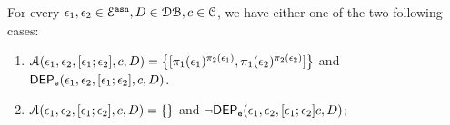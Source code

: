 %
\begin{lem}
\label{lem:inv_alg2}
For every $\mathtt{\epsilon}_1, \mathtt{\epsilon}_2 \in \mathcal{E}^{\mathtt{{asn}}}, D \in \mathcal{DB} , c \in \mathcal{C}$, we have either one of the two following cases:
\begin{enumerate}
  \item $\mathcal{A}(\event_1, \event_2,  [\event_1; \event_2], c, D) = 
  \left\{[\pi_1(\event_1)^{\pi_2(\event_1)}, \pi_1(\event_2)^{\pi_2(\event_2)}] \right \}$ 
  and $\mathsf{DEP_{\mathtt{e}}}(\mathtt{\epsilon}_1, \mathtt{\epsilon}_2, [\mathtt{\epsilon}_1; \mathtt{\epsilon}_2], c, D)$.
  \item  $\mathcal{A}(\mathtt{\epsilon}_1, \mathtt{\epsilon}_2, [\mathtt{\epsilon}_1; \mathtt{\epsilon}_2], c, D) = \{\}$ 
  and $\neg \mathsf{DEP_{\mathtt{e}}}(\mathtt{\epsilon}_1, \mathtt{\epsilon}_2, [\mathtt{\epsilon}_1; \mathtt{\epsilon}_2] c, D)$;
\end{enumerate}
\end{lem}
